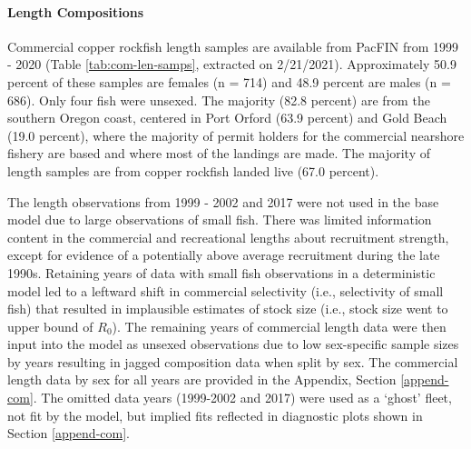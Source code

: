 \documentclass[11pt,
  english,
  a4paper,
]{article}
\begin{document}
\leavevmode\tagmcend\tagstructend\par


\hypertarget{commercial-fishery-length-and-age-data}{%
\paragraph{Length Compositions}\label{commercial-fishery-length-and-age-data}}

\leavevmode\tagmcend\tagstructend


Commercial copper rockfish length samples are available from PacFIN from 1999 - 2020 (Table \ref{tab:com-len-samps}, extracted on 2/21/2021). Approximately 50.9 percent of these samples are females (n = 714) and 48.9 percent are males (n = 686). Only four fish were unsexed. The majority (82.8 percent) are from the southern Oregon coast, centered in Port Orford (63.9 percent) and Gold Beach (19.0 percent), where the majority of permit holders for the commercial nearshore fishery are based and where most of the landings are made. The majority of length samples are from copper rockfish landed live (67.0 percent).

\leavevmode\tagmcend\tagstructend\par


The length observations from 1999 - 2002 and 2017 were not used in the base model due to large observations of small fish. There was limited information content in the commercial and recreational lengths about recruitment strength, except for evidence of a potentially above average recruitment during the late 1990s. Retaining years of data with small fish observations in a deterministic model led to a leftward shift in commercial selectivity (i.e., selectivity of small fish) that resulted in implausible estimates of stock size (i.e., stock size went to upper bound of {\(R_0\)\leavevmode\tagmcend\tagstructend}). The remaining years of commercial length data were then input into the model as unsexed observations due to low sex-specific sample sizes by years resulting in jagged composition data when split by sex. The commercial length data by sex for all years are provided in the Appendix, Section \ref{append-com}. The omitted data years (1999-2002 and 2017) were used as a `ghost' fleet, not fit by the model, but implied fits reflected in diagnostic plots shown in Section \ref{append-com}.
\end{document}
